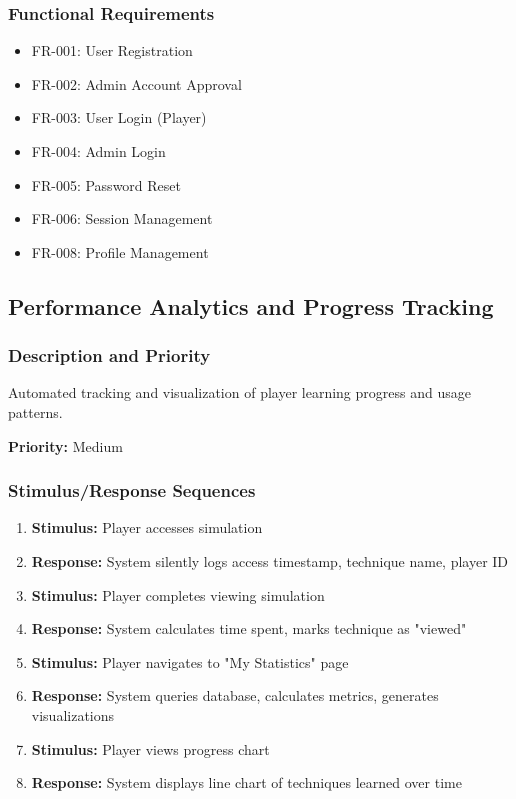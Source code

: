 \documentclass[12pt,a4paper]{article}
\begin{document}
\begin{enumerate}
\subsubsection{Functional Requirements}
\begin{itemize}
    \item FR-001: User Registration
    \item FR-002: Admin Account Approval
    \item FR-003: User Login (Player)
    \item FR-004: Admin Login
    \item FR-005: Password Reset
    \item FR-006: Session Management
    \item FR-008: Profile Management
\end{itemize}

\subsection{Performance Analytics and Progress Tracking}

\subsubsection{Description and Priority}
Automated tracking and visualization of player learning progress and usage patterns.

\textbf{Priority:} Medium

\subsubsection{Stimulus/Response Sequences}
\begin{enumerate}
    \item \textbf{Stimulus:} Player accesses simulation
    \item \textbf{Response:} System silently logs access timestamp, technique name, player ID
    \item \textbf{Stimulus:} Player completes viewing simulation
    \item \textbf{Response:} System calculates time spent, marks technique as "viewed"
    \item \textbf{Stimulus:} Player navigates to "My Statistics" page
    \item \textbf{Response:} System queries database, calculates metrics, generates visualizations
    \item \textbf{Stimulus:} Player views progress chart
    \item \textbf{Response:} System displays line chart of techniques learned over time
\end{enumerate}


\end{enumerate}
\end{document}
